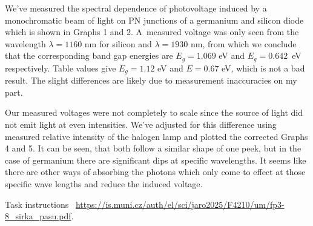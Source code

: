 \documentclass[a4paper,11pt]{article}
\begin{document}
We've measured the spectral dependence of photovoltage induced by a monochromatic beam of light on PN junctions of a germanium and silicon diode which is shown in Graphs 1 and 2. A~measured voltage was only seen from the wavelength $ \lambda = 1160 $ nm for silicon and $ \lambda = 1930 $ nm, from which we conclude that the corresponding band gap energies are $ E_g = 1.069 $ eV and $ E_g = 0.642 $~eV respectively. Table values give $ E_g = 1.12 $ eV and $ E = 0.67 $ eV, which is not a bad result. The slight differences are likely due to measurement inaccuracies on my part.

Our measured voltages were not completely to scale since the source of light did not emit light at even intensities. We've adjusted for this difference using measured relative intensity of the halogen lamp and plotted the corrected Graphs 4 and 5. It can be seen, that both follow a similar shape of one peek, but in the case of germanium there are significant dips at specific wavelengths. It seems like there are other ways of absorbing the photons which only come to effect at those specific wave lengths and reduce the induced voltage. 


\begin{thebibliography}{0}
 Task instructions ~\url{https://is.muni.cz/auth/el/sci/jaro2025/F4210/um/fp3-8_sirka_pasu.pdf}.   
\end{thebibliography}
\end{document}
